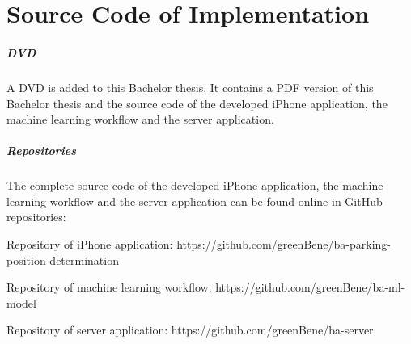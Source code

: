 \chapter{Source Code of Implementation}

\paragraph{DVD} A DVD is added to this Bachelor thesis. It contains a PDF version of this Bachelor thesis and the source code of the developed iPhone application, the machine learning workflow and the server application. 

\paragraph{Repositories} The complete source code of the developed iPhone application, the machine learning workflow and the server application can be found online in GitHub repositories:

Repository of iPhone application:\newline
https://github.com/greenBene/ba-parking-position-determination

Repository of machine learning workflow:\newline
https://github.com/greenBene/ba-ml-model

Repository of server application: \newline 
https://github.com/greenBene/ba-server

    
